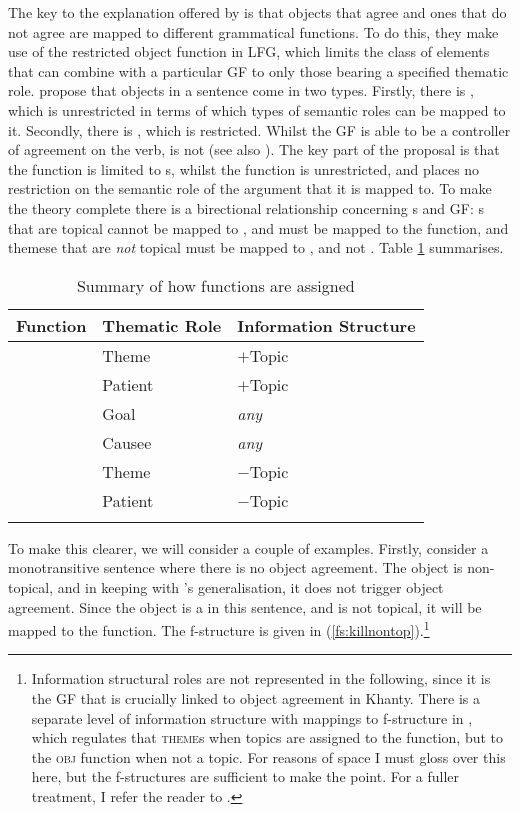 \documentclass[output=paper
,modfonts
,nonflat]{langsci/langscibook}
\begin{document}
The key to the explanation offered by \citet{dn2011} is that objects that agree and ones that do not agree are mapped to different grammatical functions.
To do this, they make use of the restricted object function in LFG, which limits the class of elements that can combine with a particular GF to only those bearing a specified thematic role. 
\citeauthor{dn2011} propose that objects in a sentence come in two types.
Firstly, there is \object, which is unrestricted in terms of which types of semantic roles can be mapped to it. Secondly, there is \robj, which is restricted. 
Whilst the GF \object{} is able to be a controller of agreement on the verb, \robj{} is not (see also \citealt{buttking1996}). 
The key part of the proposal is that the \robj{} function is limited to \theme s, whilst the \object{} function is unrestricted, and places no restriction on the semantic role of the argument that it is mapped to. 
To make the theory complete there is a birectional relationship concerning \theme s and GF: \theme s that are topical cannot be mapped to \robj, and must be mapped to the \object{} function, and themese that are \emph{not} topical must be mapped to \robj, and not \object.
Table \ref{tab:dntabsummary} summarises.

\begin{table}
	\caption{\label{tab:dntabsummary}Summary of how functions are assigned}
	\begin{tabularx}{\textwidth}{XXX}
		\lsptoprule
		Function			&	Thematic Role	&	Information Structure\\
		\midrule
		\multirow{4}{*}{\object}	&	Theme		&	$+$Topic\\
		&	Patient		&	$+$Topic\\
		&	Goal			&	\emph{any}\\
		&	Causee		&	\emph{any}\\
		\midrule
		\multirow{2}{*}{\robj}	&	Theme		&	$-$Topic\\
		&	Patient		&	$-$Topic\\
		\lspbottomrule
	\end{tabularx}
\end{table}

\newpage\noindent To make this clearer, we will consider a couple of examples. Firstly, consider a monotransitive sentence where there is no object agreement. 
The object is non-topical, and in keeping with \citeauthor{dn2011}'s generalisation, it does not trigger object agreement. 
Since the object is a \theme{} in this sentence, and is not topical, it will be mapped to the \robj{} function. The f-structure is given in (\ref{fs:killnontop}).\footnote{Information structural roles are not represented in the following, since it is the GF that is crucially linked to object agreement in Khanty.
There is a separate level of information structure with mappings to f-structure in \citet{dn2011}, which regulates that \textsc{theme}s when topics are assigned to the \robj{} function, but to the \textsc{obj} function when not a topic.
For reasons of space I must gloss over this here, but the f-structures are sufficient to make the point.
For a fuller treatment,  I refer the reader to \citet[][especially ch. 4]{dn2011}.}
\end{document}
